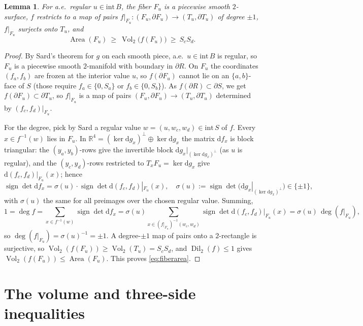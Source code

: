 \documentclass[11pt]{article}
\newtheorem{lemma}{Lemma}
\theoremstyle{remark}
\newcommand{\Vol}{\operatorname{Vol}}
\newcommand{\Dil}{\operatorname{Dil}}
\newcommand{\RR}{\mathbb{R}}
\newcommand{\Area}{\operatorname{Area}}
\newcommand{\dd}{\mathrm{d}}
\begin{document}
\begin{lemma}\label{lem:fiber}
For a.e.\ regular $u\in\mathrm{int}\,B$, the fiber $F_u$ is a piecewise smooth $2$-surface,
$f$ restricts to a map of pairs $f|_{F_u}\colon(F_u,\partial F_u)\to(T_u,\partial T_u)$ of
degree $\pm1$, $f|_{F_u}$ surjects onto $T_u$, and
\begin{equation}\label{eq:fiberarea}
\Area(F_u)\ \ge\ \Vol_2\bigl(f(F_u)\bigr)\ \ge\ S_cS_d .
\end{equation}
\end{lemma}

\begin{proof}
By Sard's theorem for $g$ on each smooth piece, a.e.\ $u\in\mathrm{int}\,B$ is regular, so
$F_u$ is a piecewise smooth $2$-manifold with boundary in $\partial R$. On $F_u$ the
coordinates $(f_a,f_b)$ are frozen at the interior value $u$, so $f(\partial F_u)$ cannot
lie on an $\{a,b\}$-face of $S$ (those require $f_a\in\{0,S_a\}$ or $f_b\in\{0,S_b\}$). As
$f(\partial R)\subset\partial S$, we get $f(\partial F_u)\subset\partial T_u$, so $f|_{F_u}$
is a map of pairs $(F_u,\partial F_u)\to(T_u,\partial T_u)$ determined by $(f_c,f_d)|_{F_u}$.

For the degree, pick by Sard a regular value $w=(u,w_c,w_d)\in\mathrm{int}\,S$ of $f$. Every
$x\in f^{-1}(w)$ lies in $F_u$. In $\RR^4=(\ker\dd g_x)^\perp\oplus\ker\dd g_x$ the matrix
$\dd f_x$ is block triangular: the $(y_a,y_b)$-rows give the invertible block
$\dd g_x|_{(\ker\dd g_x)^\perp}$ (as $u$ is regular), and the $(y_c,y_d)$-rows restricted to
$T_xF_u=\ker\dd g_x$ give $\dd(f_c,f_d)|_{F_u}(x)$; hence
\[
\operatorname{sign}\det\dd f_x=\sigma(u)\cdot\operatorname{sign}\det\dd(f_c,f_d)|_{F_u}(x),
\quad\sigma(u):=\operatorname{sign}\det\bigl(\dd g_x|_{(\ker\dd g_x)^\perp}\bigr)\in\{\pm1\},
\]
with $\sigma(u)$ the same for all preimages over the chosen regular value. Summing,
\[
1=\deg f=\sum_{x\in f^{-1}(w)}\operatorname{sign}\det\dd f_x
=\sigma(u)\!\!\sum_{x\in(f|_{F_u})^{-1}(w_c,w_d)}\!\!\operatorname{sign}\det\dd(f_c,f_d)|_{F_u}(x)
=\sigma(u)\,\deg(f|_{F_u}),
\]
so $\deg(f|_{F_u})=\sigma(u)^{-1}=\pm1$. A degree-$\pm1$ map of pairs onto a $2$-rectangle
is surjective, so $\Vol_2(f(F_u))\ge\Vol_2(T_u)=S_cS_d$, and $\Dil_2(f)\le1$ gives
$\Vol_2(f(F_u))\le\Area(F_u)$. This proves \eqref{eq:fiberarea}.
\end{proof}

\section{The volume and three-side inequalities}
\end{document}
